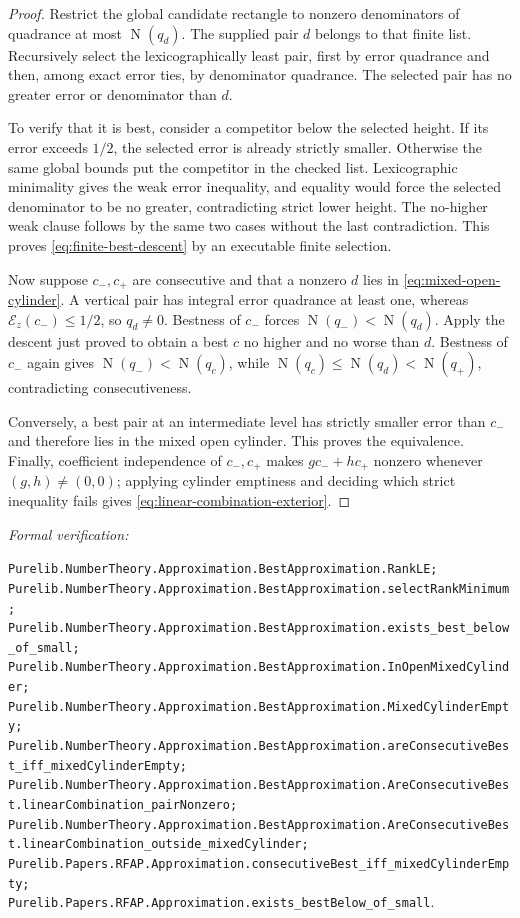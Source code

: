 \documentclass[11pt]{article}
\newcommand{\Norm}[1]{\operatorname{N}\!\left(#1\right)}
\newcommand{\leanref}[1]{\par\smallskip\noindent
  \emph{Formal verification:}\par\nobreak
  {\raggedright\nolinkurl{#1}.\par}}
\begin{document}
\begin{proof}
Restrict the global candidate rectangle to nonzero denominators of quadrance
at most $\Norm{q_d}$.  The supplied pair $d$ belongs to that finite list.
Recursively select the lexicographically least pair, first by error quadrance
and then, among exact error ties, by denominator quadrance.  The selected pair
has no greater error or denominator than $d$.

To verify that it is best, consider a competitor below the selected height.
If its error exceeds $1/2$, the selected error is already strictly smaller.
Otherwise the same global bounds put the competitor in the checked list.
Lexicographic minimality gives the weak error inequality, and equality would
force the selected denominator to be no greater, contradicting strict lower
height.  The no-higher weak clause follows by the same two cases without the
last contradiction.  This proves \eqref{eq:finite-best-descent} by an
executable finite selection.

Now suppose $c_-,c_+$ are consecutive and that a nonzero $d$ lies in
\eqref{eq:mixed-open-cylinder}.  A vertical pair has integral error quadrance
at least one, whereas $\mathcal E_z(c_-)\le1/2$, so $q_d\ne0$.  Bestness of
$c_-$ forces $\Norm{q_-}<\Norm{q_d}$.  Apply the descent just proved to obtain
a best $c$ no higher and no worse than $d$.  Bestness of $c_-$ again gives
$\Norm{q_-}<\Norm{q_c}$, while
$\Norm{q_c}\le\Norm{q_d}<\Norm{q_+}$, contradicting consecutiveness.

Conversely, a best pair at an intermediate level has strictly smaller error
than $c_-$ and therefore lies in the mixed open cylinder.  This proves the
equivalence.  Finally, coefficient independence of $c_-,c_+$ makes
$gc_-+hc_+$ nonzero whenever $(g,h)\ne(0,0)$; applying cylinder emptiness and
deciding which strict inequality fails gives
\eqref{eq:linear-combination-exterior}.
\end{proof}

\leanref{Purelib.NumberTheory.Approximation.BestApproximation.RankLE;
Purelib.NumberTheory.Approximation.BestApproximation.selectRankMinimum;
Purelib.NumberTheory.Approximation.BestApproximation.exists_best_below_of_small;
Purelib.NumberTheory.Approximation.BestApproximation.InOpenMixedCylinder;
Purelib.NumberTheory.Approximation.BestApproximation.MixedCylinderEmpty;
Purelib.NumberTheory.Approximation.BestApproximation.areConsecutiveBest_iff_mixedCylinderEmpty;
Purelib.NumberTheory.Approximation.BestApproximation.AreConsecutiveBest.linearCombination_pairNonzero;
Purelib.NumberTheory.Approximation.BestApproximation.AreConsecutiveBest.linearCombination_outside_mixedCylinder;
Purelib.Papers.RFAP.Approximation.consecutiveBest_iff_mixedCylinderEmpty;
Purelib.Papers.RFAP.Approximation.exists_bestBelow_of_small}
\end{document}
